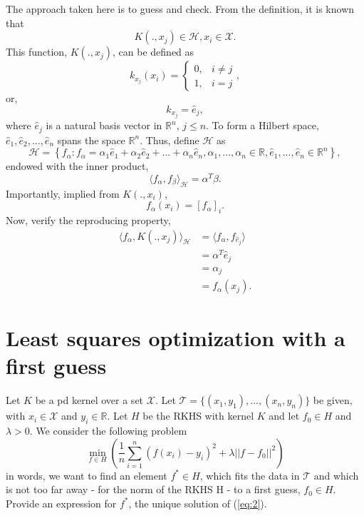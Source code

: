 \documentclass[12pt]{article}
\begin{document}
The approach taken here is to guess and check. From the definition, it is known that
\begin{equation}
K(., x_j) \in \mathcal H, x_i \in \mathcal X.
\end{equation}
This function, $K(., x_j)$, can be defined as
\begin{equation}
k_{x_j}(x_i)=\left\{\begin{array}{ll}{0,} & {i \neq j} \\ {1,} & {i=j}\end{array}\right.,
\end{equation}
or,
\begin{equation}
k_{x_j} = \hat{e}_j,
\end{equation}
where $\hat{e}_j$ is a natural basis vector in $\mathbb R^n$, $j \le n$. To form a Hilbert space, $\hat{e}_1,  \hat{e}_2,..., \hat{e}_n$ spans the space $\mathbb R^n$. Thus, define $\mathcal H$ as
\begin{equation}
\mathcal H = \left\{ f_{\alpha} : f_{\alpha} = \alpha_1  \hat{e}_1 + \alpha_2  \hat{e}_2 + ... + \alpha_n  \hat{e}_n, \alpha_1, ..., \alpha_n \in \mathbb R, \hat{e}_1,...,\hat{e}_n \in \mathbb R^n \right\},
\end{equation}
endowed with the inner product,
\begin{equation}
\langle f_\alpha, f_\beta \rangle_{\mathcal H} = \alpha^T \beta.
\end{equation}
Importantly, implied from $K(.,x_i)$,
\begin{equation}
f_\alpha(x_i) = [f_\alpha]_i.
\end{equation}
Now, verify the reproducing property,
\begin{equation}
\begin{aligned}
\langle f_\alpha, K(., x_j) \rangle_{\mathcal H}  &=\langle f_\alpha, f_{\hat{e}_j} \rangle \\
&= \alpha^T {\hat{e}_j} \\
&= \alpha_j \\
&= f_\alpha (x_j).
\end{aligned}
\end{equation}


\newpage
\section{Least squares optimization with a first guess} 
Let $K$ be a pd kernel over a set $\mathcal{X}$. Let $\mathcal{T}=\{(x_1,y_1),\ldots,(x_n,y_n)\}$ be given, with $x_i \in \mathcal{X}$ and $y_i \in \mathbb{R}$. Let $H$ be the RKHS with kernel $K$ and let $f_0 \in H$ and $\lambda>0$. We consider the following problem 
\begin{equation}
\label{eq:2}
\min_{f \in H}\left( \frac{1}{n}\sum_{i=1}^n (f(x_i)-y_i)^2 + \lambda||f-f_0||^2\right)
\end{equation}
in words, we want to find an element $f^* \in H$, which fits the data in $\mathcal{T}$ and which is not too far away - for the norm of the RKHS H - to a first guess, $f_0 \in H$. 
Provide an expression for $f^*$, the unique solution of (\ref{eq:2}). 
\end{document}
